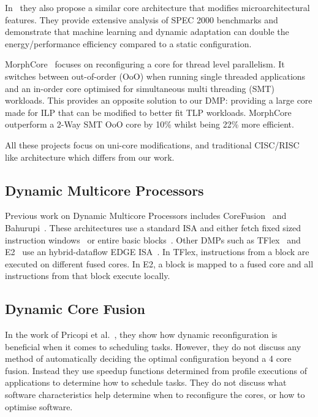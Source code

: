 In~\cite{dubach13dynamic} they also propose a similar core architecture that modifies microarchitectural features.
They provide extensive analysis of SPEC 2000 benchmarks and demonstrate that machine learning and dynamic adaptation can double the energy/performance efficiency compared to a static configuration.

MorphCore~\cite{khubaibMorphCore2012} focuses on reconfiguring a core for thread level parallelism.
It switches between out-of-order (OoO) when running single threaded applications and an in-order core optimised for simultaneous multi threading (SMT) workloads.
This provides an opposite solution to our DMP: providing a large core made for ILP that can be modified to better fit TLP workloads.
MorphCore outperform a 2-Way SMT OoO core by 10\% whilst being 22\% more efficient.

All these projects focus on uni-core modifications, and traditional CISC/RISC like architecture which differs from our work.

\subsection{Dynamic Multicore Processors}
Previous work on Dynamic Multicore Processors includes CoreFusion~\cite{ipek2007CoreFusion} and Bahurupi~\cite{pricopi2012bahurupi,pricopiSchedCoreComp2014}.
These architectures use a standard ISA and either fetch fixed sized instruction windows~\cite{ipek2007CoreFusion} or entire basic blocks~\cite{pricopi2012bahurupi}.
Other DMPs such as TFlex~\cite{kim2007tflex} and E2~\cite{e2} use an hybrid-dataflow EDGE ISA~\cite{burger04edge}. 
In TFlex, instructions from a block are executed on different fused cores.
In E2, a block is mapped to a fused core and all instructions from that block execute locally.

\subsection{Dynamic Core Fusion}
In the work of Pricopi et al.~\cite{pricopiSchedCoreComp2014}, they show how dynamic reconfiguration is beneficial when it comes to scheduling tasks.
However, they do not discuss any method of automatically deciding the optimal configuration beyond a 4 core fusion.
Instead they use speedup functions determined from profile executions of applications to determine how to schedule tasks.
They do not discuss what software characteristics help determine when to reconfigure the cores, or how to optimise software.

